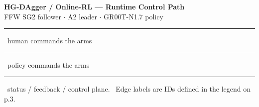 \documentclass{article}
\begin{document}
\begin{center}
{\LARGE\bfseries HG-DAgger / Online-RL --- Runtime Control Path}\\[1mm]
{\small FFW SG2 follower $\cdot$ A2 leader $\cdot$ GR00T-N1.7 policy}\\[1.5mm]
{\footnotesize\itshape
\textcolor{eHuman}{\rule{5mm}{1.2pt}}~human commands the arms \quad
\textcolor{eAuto}{\rule{5mm}{1.2pt}}~policy commands the arms \quad
\textcolor{eData}{\rule{5mm}{0.6pt}}~status / feedback / control plane.
\ Edge labels are IDs defined in the legend on p.3.}
\end{center}
\vspace{1mm}
\end{document}
